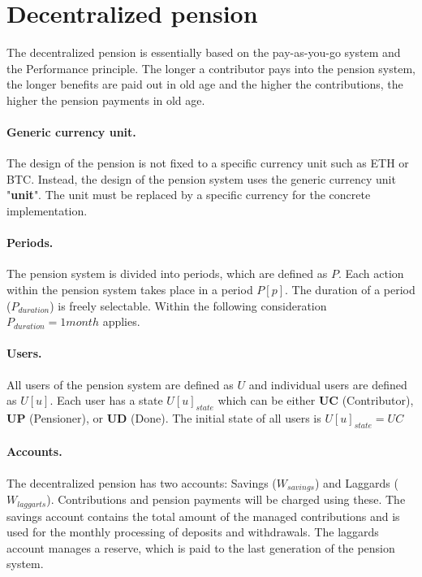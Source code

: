 \section{Decentralized pension}
The decentralized pension is essentially based on the pay-as-you-go system and the
Performance principle. The longer a contributor pays into the pension system, 
the longer benefits are paid out in old age and the higher the contributions,
the higher the pension payments in old age.

\paragraph{Generic currency unit.} The design of the pension is not fixed to a specific currency unit such as ETH or BTC. Instead, the design of the pension system uses the generic currency unit "\textbf{unit}". The unit must be replaced by a specific currency for the concrete implementation.

\paragraph{Periods.} The pension system is divided into periods, which are defined as $P$. Each action within the pension system takes place in a period $P[p]$. The duration of a period ($P_{duration}$) is freely selectable. Within the following consideration $P_{duration} = 1 month$ applies.

\paragraph{Users.} All users of the pension system are defined as $U$ and individual users are defined as $U[u]$. Each user has a state $U[u]_{state}$ which can be either \textbf{UC} (Contributor),
\textbf{UP} (Pensioner), or \textbf{UD} (Done).
The initial state of all users is $U[u]_{state} = UC$ 

\paragraph{Accounts.} The decentralized pension has two accounts: Savings ($W_{savings}$) and Laggards  ($W_{laggarts}$). Contributions and pension payments will be charged using these. The savings account contains the total amount of the managed contributions and is used for the monthly processing of deposits and withdrawals. The laggards account manages a reserve, which is paid to the last generation of the pension system.

